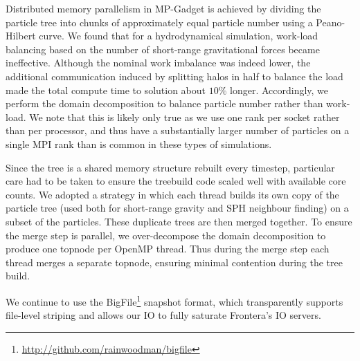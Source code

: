 \documentclass[fleqn,usenatbib]{mnras}
\newcommand{\software}[1]{{\small #1}}
\begin{document}
Distributed memory parallelism in MP-Gadget is achieved by dividing the particle tree into chunks of approximately equal particle number using a Peano-Hilbert curve.
We found that for a hydrodynamical simulation, work-load balancing based on the number of short-range gravitational forces became ineffective. Although the nominal work imbalance was indeed lower, the additional communication induced by splitting halos in half to balance the load made the total compute time to solution about $10\%$ longer. Accordingly, we perform the domain decomposition to balance particle number rather than work-load. We note that this is likely only true as we use one rank per socket rather than per processor, and thus have a substantially larger number of particles on a single MPI rank than is common in these types of simulations.


Since the tree is a shared memory structure rebuilt every timestep, particular care had to be taken to ensure the treebuild code scaled well with available core counts. We adopted a strategy in which each thread builds its own copy of the particle tree (used both for short-range gravity and SPH neighbour finding) on a subset of the particles. These duplicate trees are then merged together. To ensure the merge step is parallel, we over-decompose the domain decomposition to produce one topnode per OpenMP thread. Thus during the merge step each thread merges a separate topnode, ensuring minimal contention during the tree build.


We continue to use the \software{BigFile}\footnote{\url{http://github.com/rainwoodman/bigfile}} snapshot format, which transparently supports file-level striping and allows our IO to fully saturate Frontera's IO servers.


\end{document}
